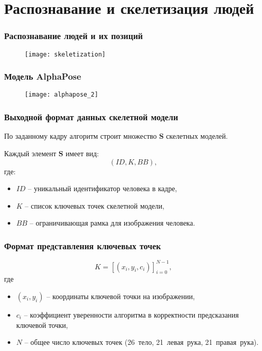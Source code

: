 \section{Распознавание и скелетизация людей}
\begin{frame}
    \frametitle{Распознавание людей и их позиций}
    \begin{figure}
        \centering
        \texttt{[image: skeletization]}
    \end{figure}
\end{frame}


\begin{frame}
    \frametitle{Модель AlphaPose}
    \begin{figure}
        \centering
        \texttt{[image: alphapose\_2]}
    \end{figure}
\end{frame}

\begin{frame}
    \frametitle{Выходной формат данных скелетной модели}
    По заданному кадру алгоритм строит множество $\mathbf{S}$ скелетных моделей.

    Каждый элемент $\mathbf{S}$ имеет вид:
    $$ \left(ID, K, BB\right), $$
    где:
    \begin{itemize}
        \item $ID$ -- уникальный идентификатор человека в кадре,
        \item $K$ -- список ключевых точек скелетной модели,
        \item $BB$ -- ограничивающая рамка для изображения человека.
    \end{itemize}
\end{frame}

\begin{frame}
    \frametitle{Формат представления ключевых точек}
    $$ K = [(x_i, y_i, c_i)]_{i=0}^{N-1}, $$
    где
    \begin{itemize}
        \item $(x_i, y_i)$ -- координаты ключевой точки на изображении,
        \item $c_i$ -- коэффициент уверенности алгоритма в корректности предсказания ключевой точки,
        \item $N$ -- общее число ключевых точек (26~тело, 21~левая~рука, 21~правая~рука).
    \end{itemize}
\end{frame}

